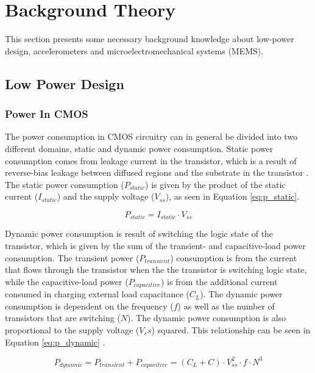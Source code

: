 \chapter{Background Theory}

This section presents some necessary background knowledge about low-power design, accelerometers and microelectromechanical systems (MEMS).

\section{Low Power Design}

\subsection{Power In CMOS}

The power consumption in CMOS circuitry can in general be divided into two different domains, static and dynamic power consumption. Static power consumption comes from leakage current in the transistor, which is a result of reverse-bias leakage between diffused regions and the
substrate in the transistor \cite{static_dynamic_power}. The static power consumption ($P_{static}$) is given by the product of the static current ($I_{static}$) and the supply voltage ($V_{ss}$), as seen in Equation \ref{eq:p_static}. 

\begin{equation}
P_{static} = I_{static} \cdot V_{ss}
\label{eq:p_static}
\end{equation}

Dynamic power consumption is result of switching the logic state of the transistor, which is given by the sum of the transient- and capacitive-load power consumption. The transient power ($P_{transient}$) consumption is from the current that flows through the transistor when the the transistor is switching logic state, while the capacitive-load power ($P_{capacitive}$) is from the additional current consumed in charging external load capacitance ($C_{L}$). The dynamic power consumption is dependent on the frequency ($f$) as well as the number of transistors that are switching ($N$). The dynamic power consumption is also proportional to the supply voltage ($V_ss$) squared. This relationship can be seen in Equation \ref{eq:p_dynamic} \cite{cmos_power_consumption}.

\begin{equation}
P_{dynamic} = P_{transient} + P_{capacitive} = (C_L + C) \cdot V_{ss}^{2} \cdot f \cdot N^3
\label{eq:p_dynamic}
\end{equation}

